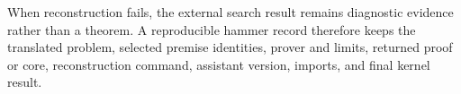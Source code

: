 When reconstruction fails, the external search result remains diagnostic
evidence rather than a theorem. A reproducible hammer record therefore keeps
the translated problem, selected premise identities, prover and limits,
returned proof or core, reconstruction command, assistant version, imports,
and final kernel result.
